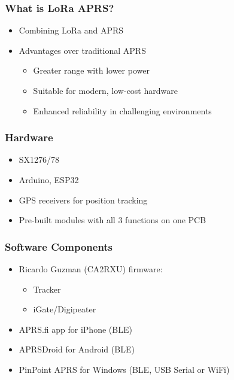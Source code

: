 \documentclass[aspectratio=169]{beamer}
\begin{document}
\begin{frame}[t]
  \frametitle{What is LoRa APRS?}
  \begin{itemize}
    \item Combining LoRa and APRS
    \medskip
    \item Advantages over traditional APRS
    \medskip
    \begin{itemize}
      \item Greater range with lower power
      \medskip
      \item Suitable for modern, low-cost hardware
      \medskip
      \item Enhanced reliability in challenging environments
    \end{itemize}
  \end{itemize}
\end{frame}

\begin{frame}[t]
  \frametitle{Hardware}
  \begin{itemize}
    \item SX1276/78
    \medskip
    \item Arduino, ESP32
    \medskip
    \item GPS receivers for position tracking
    \medskip
    \item Pre-built modules with all 3 functions on one PCB
  \end{itemize}
\end{frame}

\begin{frame}[t]
  \frametitle{Software Components}
  \begin{itemize}
    \item Ricardo Guzman (CA2RXU) firmware:
    \medskip
    \begin{itemize}
      \item Tracker
      \medskip
      \item iGate/Digipeater
    \end{itemize}
    \medskip
    \item APRS.fi app for iPhone (BLE)
    \medskip
    \item APRSDroid for Android (BLE)
    \medskip
    \item PinPoint APRS for Windows (BLE, USB Serial or WiFi)
  \end{itemize}
\end{frame}
\end{document}
